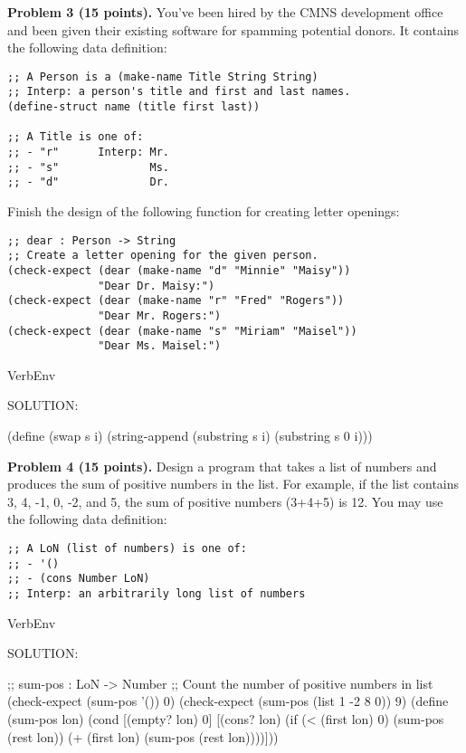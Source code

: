 \documentclass[12pt]{article}
\begin{document}

\newpage

\noindent
{\bf Problem 3 (15 points).}
%
You've been hired by the CMNS development office and been given their
existing software for spamming potential donors.  It contains the following
data definition:
\begin{verbatim}
;; A Person is a (make-name Title String String)
;; Interp: a person's title and first and last names.
(define-struct name (title first last))

;; A Title is one of:
;; - "r"      Interp: Mr.
;; - "s"              Ms.
;; - "d"              Dr.
\end{verbatim}

\noindent
Finish the design of the following function for creating letter
openings:
\begin{verbatim}
;; dear : Person -> String
;; Create a letter opening for the given person.
(check-expect (dear (make-name "d" "Minnie" "Maisy"))
              "Dear Dr. Maisy:")
(check-expect (dear (make-name "r" "Fred" "Rogers"))
              "Dear Mr. Rogers:")
(check-expect (dear (make-name "s" "Miriam" "Maisel"))
              "Dear Ms. Maisel:")
\end{verbatim}


\begin{SaveVerbatim}{VerbEnv}

SOLUTION:

(define (swap s i)
  (string-append (substring s i)
                 (substring s 0 i)))
\end{SaveVerbatim}


\newpage
\noindent
{\bf Problem 4 (15 points).}  
%
Design a program that takes a list of numbers and produces the sum of
positive numbers in the list.  For example, if the list contains 3, 4,
-1, 0, -2, and 5, the sum of positive numbers (3+4+5) is 12.  You may
use the following data definition:

\begin{verbatim}
;; A LoN (list of numbers) is one of:
;; - '()
;; - (cons Number LoN)
;; Interp: an arbitrarily long list of numbers
\end{verbatim}


\begin{SaveVerbatim}{VerbEnv}

SOLUTION:

;; sum-pos : LoN -> Number
;; Count the number of positive numbers in list
(check-expect (sum-pos '()) 0)
(check-expect (sum-pos (list 1 -2 8 0)) 9)
(define (sum-pos lon)
  (cond [(empty? lon) 0]
        [(cons? lon)
         (if (< (first lon) 0)
             (sum-pos (rest lon))
             (+ (first lon) (sum-pos (rest lon))))]))
\end{SaveVerbatim}
\end{document}
